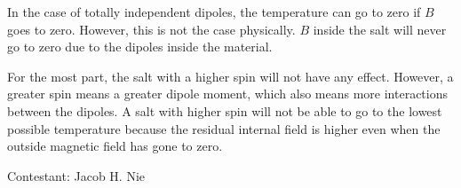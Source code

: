 \documentclass[12pt,letterpaper]{article}
\begin{document}
In the case of totally independent dipoles, the temperature can go to zero if $B$ goes to zero.  However, this is not the case physically.  $B$ inside the salt will never go to zero due to the dipoles inside the material.  

For the most part, the salt with a higher spin will not have any effect.  However, a greater spin means a greater dipole moment, which also means more interactions between the dipoles.  A salt with higher spin will not be able to go to the lowest possible temperature because the residual internal field is higher even when the outside magnetic field has gone to zero.  

\vspace{1cm}

\hfill Contestant: Jacob H. Nie
\end{document}
